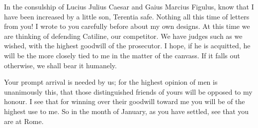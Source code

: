 

 In the consulship of Lucius Julius Caesar and Gaius Marcius Figulus, know that I have been increased by a little son, Terentia safe. Nothing all this time of letters from you! I wrote to you carefully before about my own designs. At this time we are thinking of defending Catiline, our competitor. We have judges such as we wished, with the highest goodwill of the prosecutor. I hope, if he is acquitted, he will be the more closely tied to me in the matter of the canvass. If it falls out otherwise, we shall bear it humanely.

 Your prompt arrival is needed by us; for the highest opinion of men is unanimously this, that those distinguished friends of yours will be opposed to my honour. I see that for winning over their goodwill toward me you will be of the highest use to me. So in the month of January, as you have settled, see that you are at Rome.
